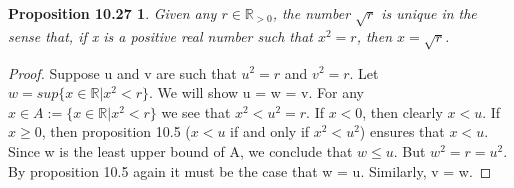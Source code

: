 \documentclass[12pt]{amsart}
\newcommand{\R}{\mathbb{R}}
\begin{document}
\newtheorem*{prop10.27}{Proposition 10.27}
\begin{prop10.27}
	Given any $r \in \R_{>0}$, the number $\sqrt{r}$ is unique in the sense that, if x is a positive real number such that $x^2 = r$, then $x = \sqrt{r}$.
\end{prop10.27}

\begin{proof}
	Suppose u and v are such that $u^2 = r$ and $v^2 = r$. Let $w = sup\{x \in \R | x^2 < r\}$. We will show u = w = v. For any $x \in A := \{x \in \R | x^2 < r\}$ we see that $x^2 < u^2 = r$. If $x < 0$, then clearly $x < u$. If $x \geq 0$, then proposition 10.5 ($x < u$ if and only if $x^2 < u^2$) ensures that $x < u$. Since w is the least upper bound of A, we conclude that $w \leq u$. But $w^2 = r = u^2$. By proposition 10.5 again it must be the case that w = u. Similarly, v = w.
\end{proof}
\end{document}
